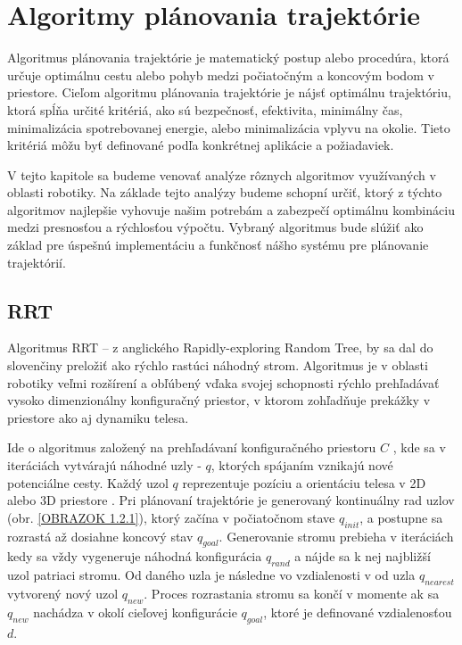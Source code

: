 \section{Algoritmy plánovania trajektórie}
\label{kap:2}
Algoritmus plánovania trajektórie je matematický postup alebo procedúra, ktorá určuje optimálnu cestu alebo pohyb medzi počiatočným a koncovým bodom v priestore.
Cieľom algoritmu plánovania trajektórie je nájsť optimálnu trajektóriu, ktorá spĺňa určité kritériá, ako sú bezpečnosť, efektivita, minimálny čas, minimalizácia spotrebovanej energie, alebo minimalizácia vplyvu na okolie. Tieto kritériá môžu byť definované podľa konkrétnej aplikácie a požiadaviek.

V tejto kapitole sa budeme venovať analýze rôznych algoritmov využívaných v oblasti robotiky. Na základe tejto analýzy budeme schopní určiť, ktorý z týchto algoritmov najlepšie vyhovuje našim potrebám a zabezpečí optimálnu kombináciu medzi presnosťou a rýchlosťou výpočtu. Vybraný algoritmus bude slúžiť ako základ pre úspešnú implementáciu a funkčnosť nášho systému pre plánovanie trajektórií.
 
\subsection{RRT}
\label{kap:2.1}

Algoritmus RRT – z anglického Rapidly-exploring Random Tree, by sa dal do slovenčiny preložiť ako rýchlo rastúci náhodný strom. Algoritmus je v oblasti robotiky veľmi rozšírení a obľúbený vďaka svojej schopnosti rýchlo prehľadávať vysoko dimenzionálny konfiguračný priestor, v ktorom zohľadňuje prekážky v priestore ako aj dynamiku telesa. \newline

Ide o algoritmus založený na prehľadávaní konfiguračného priestoru $C$ , kde sa v iteráciách vytvárajú náhodné uzly - $q$, ktorých spájaním vznikajú nové potenciálne cesty. Každý uzol $q$ reprezentuje pozíciu a orientáciu telesa v 2D alebo 3D priestore \cite{RRT-Kuffner}. Pri plánovaní trajektórie je generovaný kontinuálny rad uzlov (obr. \ref{OBRAZOK 1.2.1}), ktorý začína v počiatočnom stave $q_{init}$,  a postupne sa rozrastá až dosiahne koncový stav $q_{goal}$.  Generovanie stromu prebieha v iteráciách kedy sa vždy vygeneruje náhodná konfigurácia $q_{rand}$ a nájde sa k nej najbližší uzol patriaci stromu. Od daného uzla je následne vo vzdialenosti v od uzla $q_{nearest}$ vytvorený nový uzol $q_{new}$. Proces rozrastania stromu sa končí v momente ak sa $q_{new}$  nachádza v okolí cieľovej konfigurácie $q_{goal}$, ktoré je definované vzdialenosťou $d$. 


